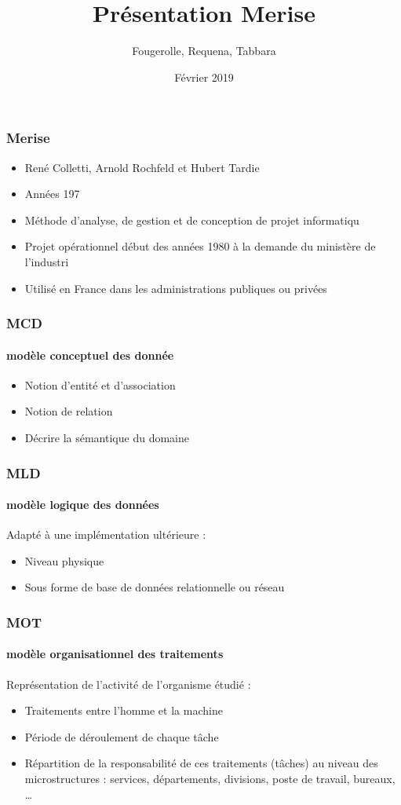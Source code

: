 \documentclass{beamer}
\title{Présentation Merise}
\author{Fougerolle, Requena, Tabbara}
\date{Février 2019}
\begin{document}
\maketitle
\begin{frame}
\frametitle{Merise}
\begin{itemize}
\item René Colletti, Arnold Rochfeld et Hubert Tardie
\item Années 197
\item Méthode d'analyse, de gestion et de conception de projet informatiqu
\item Projet opérationnel début des années 1980 à la demande du ministère de l'industri
\item Utilisé en France dans les administrations publiques ou privées
\end{itemize}
\end{frame}
\begin{frame}
\frametitle{MCD}
\framesubtitle{modèle conceptuel des donnée}
\begin{itemize}
\item Notion d'entité et d'association
\item Notion de relation
\item Décrire la sémantique du domaine
\end{itemize}
\end{frame}
\begin{frame}
\frametitle{MLD}
\framesubtitle{modèle logique des données}
Adapté à une implémentation ultérieure :
\begin{itemize}
\item Niveau physique
\item Sous forme de base de données relationnelle ou réseau
\end{itemize}
\end{frame}
\begin{frame}
\frametitle{MOT}
\framesubtitle{modèle organisationnel des traitements} 
Représentation de l'activité de l'organisme étudié :
\begin{itemize}
\item Traitements entre l'homme et la machine \item Période de déroulement de chaque tâche
\item Répartition de la responsabilité de ces traitements (tâches) au niveau des microstructures : services, départements, divisions, poste de travail, bureaux, …
\end{itemize}
\end{frame}
\end{document}
